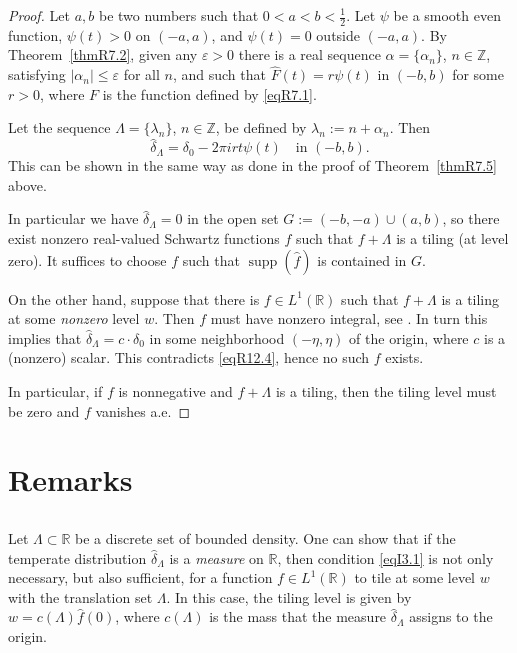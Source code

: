 \documentclass[reqno,a4paper,12pt]{amsart}
\numberwithin{equation}{section}
\numberwithin{figure}{section}
\newcommand\R{\mathbb{R}}
\newcommand\Z{\mathbb{Z}}
\newcommand\lam{\lambda}
\newcommand\Lam{\Lambda}
\newcommand\1{\mathds{1}}
\newcommand\eps{\varepsilon}
\renewcommand\leq{\leqslant}
\newcommand\sbt{\subset}
\renewcommand\hat{\widehat}
\newcommand{\ft}[1]{\widehat{#1}}
\newcommand{\supp}{\operatorname{supp}}
\newcommand{\half}{\tfrac{1}{2}}
\theoremstyle{plain}
\newcommand{\thmref}[1]{Theorem~\ref{#1}}
\theoremstyle{definition}
\begin{document}
\begin{proof}
Let $a,b$ be two numbers  such that $0 <a<b < \half$.
Let $\psi$ be a smooth even function,
$\psi(t)>0$ on $(-a,a)$, and
$\psi(t)=0$ outside $(-a,a)$.
By \thmref{thmR7.2},
given any $\eps>0$  there is a 
real sequence $\alpha = \{\alpha_n\}$, $n\in\Z$,
satisfying $|\alpha_n| \leq \eps$ for all $n$,
and such that 
$\hat F(t)= r \psi(t)$ in $(-b,b)$ for some $r>0$,
where $F$ is the function  defined by \eqref{eqR7.1}.

Let the sequence
$\Lam = \{\lam_n\}$, $n\in\Z$,
be defined by
$\lam_n:=n+\alpha_n$. Then
 \begin{equation}
\label{eqR12.4}
\ft{\delta}_\Lambda =
 \delta_0 - 2 \pi i  r t \psi(t)
\quad \text{in $(-b,b)$.}
 \end{equation}
This can be shown in the same way as done in
 the proof of \thmref{thmR7.5} above.

In particular we have $\ft{\delta}_\Lambda = 0$
in the open set $G := (-b,-a) \cup (a,b)$, so there exist  nonzero real-valued Schwartz functions $f$ such that $f+\Lam$ is a tiling (at level zero). It suffices to choose $f$ such that $\supp(\ft{f})$ is contained in $G$.

On the other hand, suppose that there is $f \in L^1(\R)$
 such that $f+\Lam$  is a tiling at some \emph{nonzero} level $w$.
 Then $f$ must have nonzero integral, see
\cite[Lemma 2.3(i)]{KL96}.  In turn this implies 
\cite[Section 4]{KL16} that $\ft{\delta}_\Lam = c \cdot \delta_0$
in some neighborhood $(-\eta, \eta)$
of the origin, where $c$ is a (nonzero) scalar.
This contradicts \eqref{eqR12.4}, hence no such $f$ exists.


In particular, if $f$ is nonnegative and $f+\Lam$
 is a tiling, then the tiling level must be zero and
 $f$ vanishes a.e.
\end{proof}









\section{Remarks} \label{secR9}



\subsection{}
Let $\Lambda\sbt\R$
 be a discrete set of bounded density. 
One can show that if the temperate distribution
$\hat\delta_\Lambda$ is a \emph{measure}
on $\R$, then 
condition \eqref{eqI3.1} is not
only necessary, but also sufficient, for
a function $f \in L^1(\R)$ to tile 
at some level $w$
with the translation set $\Lam$.
In this case, the tiling 
level is given by $w = c(\Lam) \ft{f}(0)$,
where $c(\Lam)$ is
the mass that the measure $\ft{\delta}_\Lam$
assigns to the origin.
\end{document}

